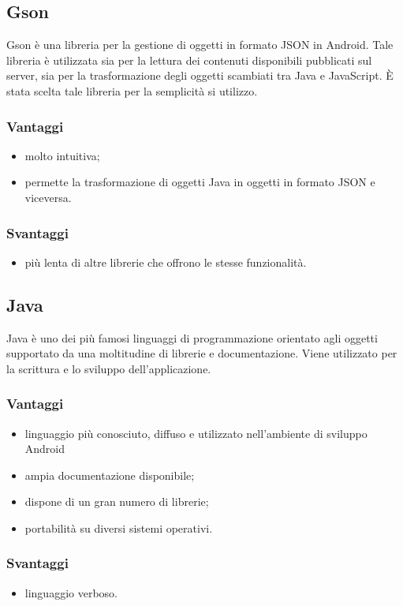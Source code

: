 \documentclass[../Tesi.tex]{subfiles}
\begin{document}
	\subsection{Gson}
		Gson è una libreria per la gestione di oggetti in formato JSON in Android. Tale libreria è utilizzata sia per la lettura dei contenuti disponibili pubblicati sul server, sia per la trasformazione degli oggetti scambiati tra Java e JavaScript. È stata scelta tale libreria per la semplicità si utilizzo.
		\subsubsection{Vantaggi}
			\begin{itemize}
				\item molto intuitiva;
				\item permette la trasformazione di oggetti Java in oggetti in formato JSON e viceversa.
			\end{itemize}	
		\subsubsection{Svantaggi}
			\begin{itemize}
				\item più lenta di altre librerie che offrono le stesse funzionalità.
			\end{itemize}

	\subsection{Java}
		Java è uno dei più famosi linguaggi di programmazione orientato agli oggetti supportato da una moltitudine di librerie e documentazione. Viene utilizzato per la scrittura e lo sviluppo dell'applicazione.
		\subsubsection{Vantaggi}
			\begin{itemize}
				\item linguaggio più conosciuto, diffuso e utilizzato nell'ambiente di sviluppo Android
				\item ampia documentazione disponibile;
				\item dispone di un gran numero di librerie;
				\item portabilità su diversi sistemi operativi.
			\end{itemize}
		\subsubsection{Svantaggi}
			\begin{itemize}
				\item linguaggio verboso.
			\end{itemize}
\end{document}
